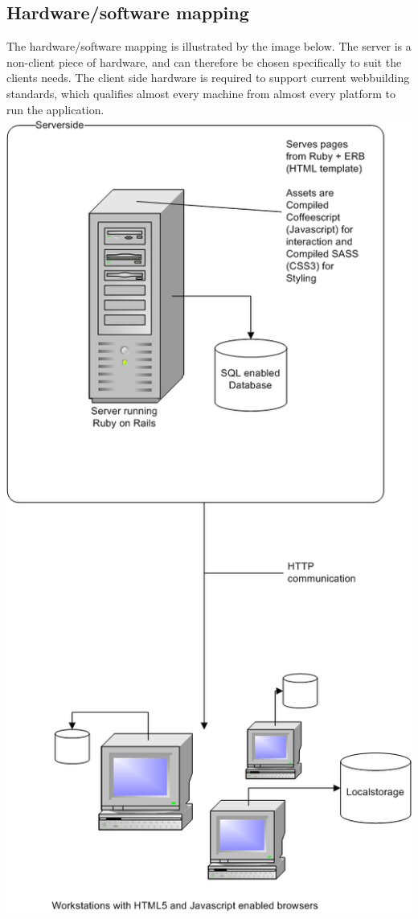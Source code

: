 \documentclass{report}
\begin{document}
		\subsection{Hardware/software mapping}
			The hardware/software mapping is illustrated by the image below. The server is a non-client piece of hardware, and can therefore be chosen specifically to suit the clients needs. The client side hardware is required to support current webbuilding standards, which qualifies almost every machine from almost every platform to run the application.\\
			\includegraphics[width=16cm]{EAD.png}
\end{document}
